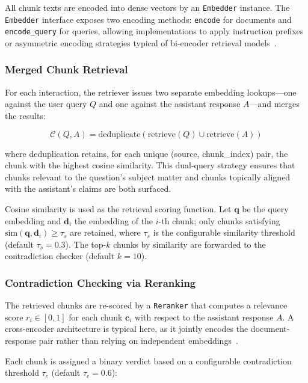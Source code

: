 All chunk texts are encoded into dense vectors by an \texttt{Embedder} instance. The \texttt{Embedder} interface exposes two encoding methods: \texttt{encode} for documents and \texttt{encode\_query} for queries, allowing implementations to apply instruction prefixes or asymmetric encoding strategies typical of bi-encoder retrieval models~\cite{reimers2019sentencebert}.

\subsubsection{Merged Chunk Retrieval}

For each interaction, the retriever issues two separate embedding lookups---one against the user query $Q$ and one against the assistant response $A$---and merges the results:

\begin{equation}
    \mathcal{C}(Q, A) = \text{deduplicate}\!\left(\text{retrieve}(Q) \cup \text{retrieve}(A)\right)
\end{equation}

where deduplication retains, for each unique (source, chunk\_index) pair, the chunk with the highest cosine similarity. This dual-query strategy ensures that chunks relevant to the question's subject matter and chunks topically aligned with the assistant's claims are both surfaced.

Cosine similarity is used as the retrieval scoring function. Let $\mathbf{q}$ be the query embedding and $\mathbf{d}_i$ the embedding of the $i$-th chunk; only chunks satisfying $\text{sim}(\mathbf{q}, \mathbf{d}_i) \geq \tau_s$ are retained, where $\tau_s$ is the configurable similarity threshold (default $\tau_s = 0.3$). The top-$k$ chunks by similarity are forwarded to the contradiction checker (default $k = 10$).

\subsubsection{Contradiction Checking via Reranking}

The retrieved chunks are re-scored by a \texttt{Reranker} that computes a relevance score $r_i \in [0, 1]$ for each chunk $\mathbf{c}_i$ with respect to the assistant response $A$. A cross-encoder architecture is typical here, as it jointly encodes the document-response pair rather than relying on independent embeddings~\cite{nogueira2019passage}.

Each chunk is assigned a binary verdict based on a configurable contradiction threshold $\tau_c$ (default $\tau_c = 0.6$):

